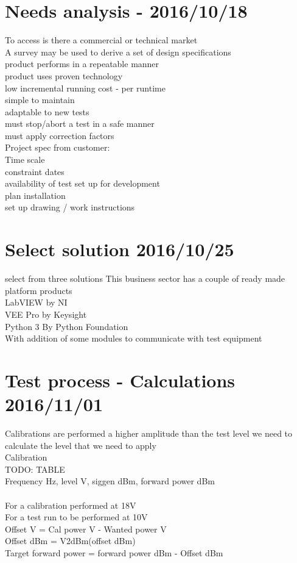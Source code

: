 \documentclass[a4paper]{article}
\begin{document}
\section{Needs analysis - 2016/10/18}
To access is there a commercial or technical market\\
A survey may be used to derive a set of design specifications\\
product performs in a repeatable manner\\
product uses proven technology\\
low incremental running cost - per runtime\\
simple to maintain\\
adaptable to new tests\\
must stop/abort a test in a safe manner\\
must apply correction factors\\

Project spec from customer:\\
Time scale\\
constraint dates\\
availability of test set up for development\\
plan installation\\
set up drawing / work instructions\\

\section{Select solution 2016/10/25}
select from three solutions
This business sector has a couple of ready made platform products\\
LabVIEW by NI\\
VEE Pro by Keysight\\
Python 3 By Python Foundation\\
  With addition of some modules to communicate with test equipment\\

\section{Test process - Calculations 2016/11/01}
Calibrations are performed a higher amplitude than the test level we need to calculate the level that we need to apply\\
Calibration\\
TODO: TABLE\\
Frequency Hz, level V, siggen dBm, forward power dBm\\
\\
For a calibration performed at 18V\\
For a test run to be performed at 10V\\
Offset V = Cal power V - Wanted power V\\
Offset dBm = V2dBm(offset dBm)\\
Target forward power = forward power dBm - Offset dBm\\
\end{document}
